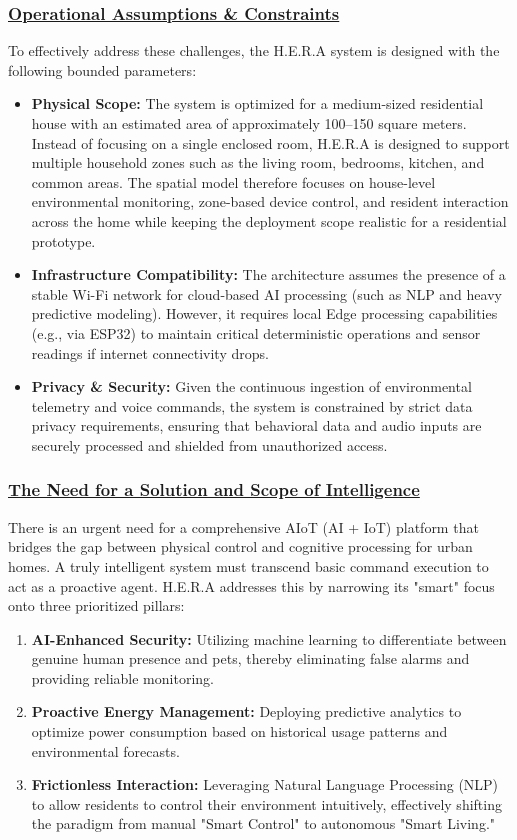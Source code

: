 \subsubsection*{\underline{Operational Assumptions \& Constraints}}
To effectively address these challenges, the H.E.R.A system is designed with the following bounded parameters:

\begin{itemize}
  \item \textbf{Physical Scope:} The system is optimized for a medium-sized residential house with an estimated area of approximately 100--150 square meters. Instead of focusing on a single enclosed room, H.E.R.A is designed to support multiple household zones such as the living room, bedrooms, kitchen, and common areas. The spatial model therefore focuses on house-level environmental monitoring, zone-based device control, and resident interaction across the home while keeping the deployment scope realistic for a residential prototype.
  \item \textbf{Infrastructure Compatibility:} The architecture assumes the presence of a stable Wi-Fi network for cloud-based AI processing (such as NLP and heavy predictive modeling). However, it requires local Edge processing capabilities (e.g., via ESP32) to maintain critical deterministic operations and sensor readings if internet connectivity drops.
  \item \textbf{Privacy \& Security:} Given the continuous ingestion of environmental telemetry and voice commands, the system is constrained by strict data privacy requirements, ensuring that behavioral data and audio inputs are securely processed and shielded from unauthorized access.
\end{itemize}

\subsubsection*{\underline{The Need for a Solution and Scope of Intelligence}}
There is an urgent need for a comprehensive AIoT (AI + IoT) platform that bridges the gap between physical control and cognitive processing for urban homes. A truly intelligent system must transcend basic command execution to act as a proactive agent. H.E.R.A addresses this by narrowing its "smart" focus onto three prioritized pillars:

\begin{enumerate}
  \item \textbf{AI-Enhanced Security:} Utilizing machine learning to differentiate between genuine human presence and pets, thereby eliminating false alarms and providing reliable monitoring.
  \item \textbf{Proactive Energy Management:} Deploying predictive analytics to optimize power consumption based on historical usage patterns and environmental forecasts.
  \item \textbf{Frictionless Interaction:} Leveraging Natural Language Processing (NLP) to allow residents to control their environment intuitively, effectively shifting the paradigm from manual "Smart Control" to autonomous "Smart Living."
\end{enumerate}

